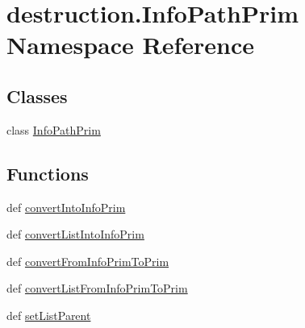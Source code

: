 \hypertarget{namespacedestruction_1_1_info_path_prim}{\section{destruction.\-Info\-Path\-Prim Namespace Reference}
\label{namespacedestruction_1_1_info_path_prim}
}
\subsection*{Classes}
\begin{DoxyCompactItemize}
\item 
class \hyperlink{classdestruction_1_1_info_path_prim_1_1_info_path_prim}{Info\-Path\-Prim}
\end{DoxyCompactItemize}
\subsection*{Functions}
\begin{DoxyCompactItemize}
\item 
def \hyperlink{namespacedestruction_1_1_info_path_prim_ac0513a4ffdb3fbbe127050a251bb32cc}{convert\-Into\-Info\-Prim}
\item 
def \hyperlink{namespacedestruction_1_1_info_path_prim_a186f2a5e80326193bdd89b2da9c9df8c}{convert\-List\-Into\-Info\-Prim}
\item 
def \hyperlink{namespacedestruction_1_1_info_path_prim_affb1675455b0f13293ed7ae4a810946e}{convert\-From\-Info\-Prim\-To\-Prim}
\item 
def \hyperlink{namespacedestruction_1_1_info_path_prim_aace253ff38f65098ff7494a5421a8296}{convert\-List\-From\-Info\-Prim\-To\-Prim}
\item 
def \hyperlink{namespacedestruction_1_1_info_path_prim_a473f2bcf2254d6c81b8c004a13846e6c}{set\-List\-Parent}
\end{DoxyCompactItemize}


